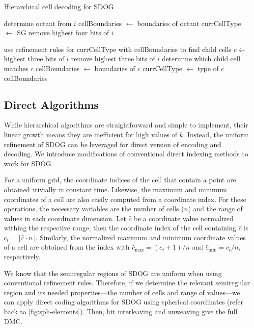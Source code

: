 \begin{algorithm}
	\caption{Hierarchical cell decoding for SDOG}
	
	\begin{algorithmic}
		
		\STATE determine octant from $i$
		\STATE cellBoundaries $\leftarrow$ boundaries of octant
		\STATE currCellType $\leftarrow$ SG
		\STATE remove highest four bits of $i$
		
		\STATE use refinement rules for currCellType with cellBoundaries to find child cells
		\STATE $c \leftarrow$ highest three bits of $i$
		\STATE remove highest three bits of $i$
		\STATE determine which child cell matches $c$
		\STATE cellBoundaries $\leftarrow$ boundaries of $c$
		\STATE currCellType $\leftarrow$ type of $c$
		\ENDFOR
		\RETURN cellBoundaries
		
	\end{algorithmic}
	\label{alg:decode}
\end{algorithm}


\subsection{Direct Algorithms}
While hierarchical algorithms are straightforward and simple to implement, their linear growth means they are inefficient for high values of $k$.
Instead, the uniform refinement of SDOG can be leveraged for direct version of encoding and decoding.
We introduce modifications of conventional direct indexing methods to work for SDOG.


For a uniform grid, the coordinate indices of the cell that contain a point are obtained trivially in constant time.
Likewise, the maximum and minimum coordinates of a cell are also easily computed from a coordinate index.
For these operations, the necessary variables are the number of cells ($n$) and the range of values in each coordinate dimension.
Let $\hat{c}$ be a coordinate value normalized withing the respective range, then the coordinate index of the cell containing $\hat{c}$ is $c_i = \lfloor \hat{c} \cdot n \rfloor$.
Similarly, the normalized maximum and minimum coordinate values of a cell are obtained from the index with
$\hat{c}_\mathrm{max} = (c_i + 1) / n$ and $\hat{c}_\mathrm{min} = c_i / n$, respectively.


We know that the semiregular regions of SDOG are uniform when using conventional refinement rules.
Therefore, if we determine the relevant semiregular region and its needed properties---the number of cells and range of values---we can apply direct coding algorithms for SDOG using spherical coordinates (refer back to \cref{fig:sph-elements}).
Then, bit interleaving and unweaving give the full DMC.


